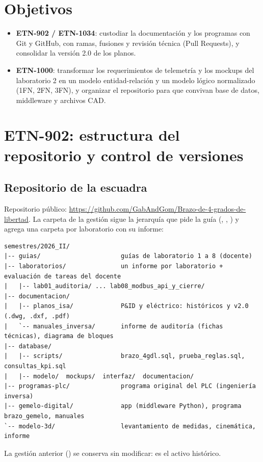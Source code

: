 \documentclass[a4paper,11pt]{article}
\begin{document}

\tableofcontents
\newpage

\section{Objetivos}
\begin{itemize}
\item \textbf{ETN-902 / ETN-1034}: custodiar la documentación y los programas con Git y GitHub, con ramas, fusiones y revisión técnica (Pull Requests), y consolidar la versión 2.0 de los planos.
\item \textbf{ETN-1000}: transformar los requerimientos de telemetría y los mockups del laboratorio 2 en un modelo entidad-relación y un modelo lógico normalizado (1FN, 2FN, 3FN), y organizar el repositorio para que convivan base de datos, middleware y archivos CAD.
\end{itemize}

\section{ETN-902: estructura del repositorio y control de versiones}
\subsection{Repositorio de la escuadra}
Repositorio público: \url{https://github.com/GabAndGom/Brazo-de-4-grados-de-libertad}. La carpeta de la gestión sigue la jerarquía que pide la guía (, , ) y agrega una carpeta por laboratorio con su informe:

\begin{lstlisting}[basicstyle=\ttfamily\scriptsize]
semestres/2026_II/
|-- guias/                      guías de laboratorio 1 a 8 (docente)
|-- laboratorios/               un informe por laboratorio + evaluación de tareas del docente
|   |-- lab01_auditoria/ ... lab08_modbus_api_y_cierre/
|-- documentacion/
|   |-- planos_isa/             P&ID y eléctrico: históricos y v2.0 (.dwg, .dxf, .pdf)
|   `-- manuales_inversa/       informe de auditoría (fichas técnicas), diagrama de bloques
|-- database/
|   |-- scripts/                brazo_4gdl.sql, prueba_reglas.sql, consultas_kpi.sql
|   |-- modelo/  mockups/  interfaz/  documentacion/
|-- programas-plc/              programa original del PLC (ingeniería inversa)
|-- gemelo-digital/             app (middleware Python), programa brazo_gemelo, manuales
`-- modelo-3d/                  levantamiento de medidas, cinemática, informe
\end{lstlisting}
La gestión anterior () se conserva sin modificar: es el activo histórico.
\end{document}
